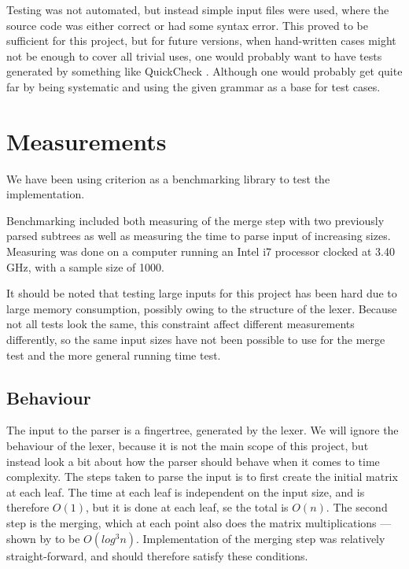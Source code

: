 \documentclass[a4paper,12pt,twosided]{report}
\renewcommand\cite{\citep}
\begin{document}
Testing was not automated, but instead simple input files were used, where the
source code was either correct or had some syntax error. This proved to be
sufficient for this project, but for future versions, when hand-written cases
might not be enough to cover all trivial uses, one would probably want to have
tests generated by something like QuickCheck \cite{quickcheck}. Although one
would probably get quite far by being systematic and using the given grammar as
a base for test cases. 

\section{Measurements}
We have been using criterion \cite{criterion} as a benchmarking library to test
the implementation. 

Benchmarking included both measuring of the merge step with
two previously parsed subtrees as well as measuring the time to parse input of
increasing sizes. Measuring was done on a computer running an Intel i7 processor
clocked at 3.40 GHz, with a sample size of 1000. 

It should be noted that testing large inputs for this project has been hard due
to large memory consumption, possibly owing to the structure of the lexer.
Because not all tests look the same, this constraint affect different
measurements differently, so the same input sizes have not been possible to use
for the merge test and the more general running time test.

\subsection{Behaviour}
The input to the parser is a fingertree, generated by the lexer. We will ignore
the behaviour of the lexer, because it is not the main scope of this project, but
instead look a bit about how the parser should behave when it comes to time
complexity. The steps taken to parse the input is to first create the initial
matrix at each leaf. The time at each leaf is independent on the input size, and
is therefore $O(1)$, but it is done at each leaf, se the total is $O(n)$. The
second step is the merging, which at each point also does the matrix
multiplications --- shown by \citet{parparsepaper} to be $O(log^3 n)$.
Implementation of the merging step was relatively straight-forward, and should
therefore satisfy these conditions. 
\end{document}
